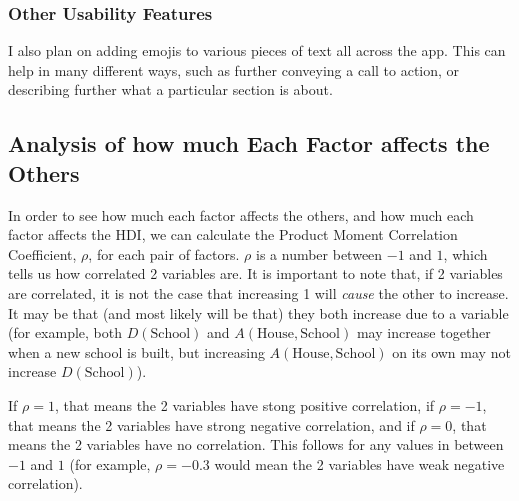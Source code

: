 \documentclass[12pt]{report}
\begin{document}
\subsubsection{Other Usability Features}
I also plan on adding emojis to various pieces of text all across the app. This can help in many different ways, such as further conveying a call to action, or describing further what a particular section is about.

\subsection{Analysis of how much Each Factor affects the Others}\label{sec:analysisOfFactors}
In order to see how much each factor affects the others, and how much each factor affects the HDI, we can calculate the Product Moment Correlation Coefficient, $\rho$, for each pair of factors. $\rho$ is a number between $-1$ and $1$, which tells us how correlated 2 variables are. It is important to note that, if 2 variables are correlated, it is not the case that increasing 1 will \textit{cause} the other to increase. It may be that (and most likely will be that) they both increase due to a  variable (for example, both $D\left(\text{School}\right)$ and $A\left(\text{House},\text{School}\right)$ may increase together when a new school is built, but increasing $A\left(\text{House},\text{School}\right)$ on its own may not increase $D\left(\text{School}\right)$).

If $\rho=1$, that means the 2 variables have stong positive correlation, if $\rho=-1$, that means the 2 variables have strong negative correlation, and if $\rho=0$, that means the 2 variables have no correlation. This follows for any values in between $-1$ and $1$ (for example, $\rho=-0.3$ would mean the 2 variables have weak negative correlation).
\end{document}
